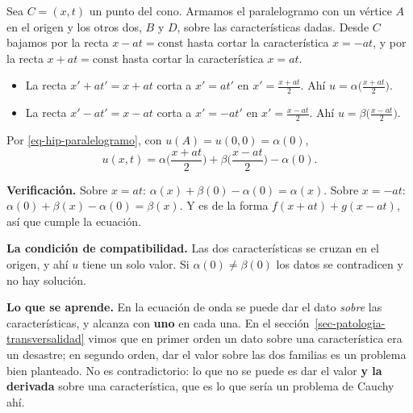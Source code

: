\documentclass[
  spanish,
  a4paper,
]{scrbook}
\providecommand{\tightlist}{%
  \setlength{\itemsep}{0pt}\setlength{\parskip}{0pt}}
\theoremstyle{definition}
\theoremstyle{plain}
\theoremstyle{definition}
\theoremstyle{plain}
\theoremstyle{definition}
\theoremstyle{remark}
\begin{document}
\begin{tcolorbox}[enhanced jigsaw, arc=.35mm, bottomrule=.15mm, bottomtitle=1mm, breakable, colback=white, colbacktitle=quarto-callout-tip-color!10!white, colframe=quarto-callout-tip-color-frame, coltitle=black, left=2mm, leftrule=.75mm, opacityback=0, opacitybacktitle=0.6, rightrule=.15mm, title=\textcolor{quarto-callout-tip-color}{\faLightbulb}\hspace{0.5em}{Solución}, titlerule=0mm, toprule=.15mm, toptitle=1mm]

Sea \(C=(x,t)\) un punto del cono. Armamos el paralelogramo con un
vértice \(A\) en el origen y los otros dos, \(B\) y \(D\), sobre las
características dadas. Desde \(C\) bajamos por la recta
\(x-at=\text{const}\) hasta cortar la característica \(x = -at\), y por
la recta \(x+at = \text{const}\) hasta cortar la característica
\(x=at\).

\begin{itemize}
\tightlist
\item
  La recta \(x' + at' = x + at\) corta a \(x' = at'\) en
  \(x' = \tfrac{x+at}{2}\). Ahí \(u = \alpha\big(\tfrac{x+at}{2}\big)\).
\item
  La recta \(x' - at' = x - at\) corta a \(x' = -at'\) en
  \(x' = \tfrac{x-at}{2}\). Ahí \(u = \beta\big(\tfrac{x-at}{2}\big)\).
\end{itemize}

Por \ref{eq-hip-paralelogramo}, con \(u(A) = u(0,0) = \alpha(0)\), \[
\boxed{\;u(x,t) = \alpha\!\Big(\frac{x+at}{2}\Big) + \beta\!\Big(\frac{x-at}{2}\Big) - \alpha(0).\;}
\]

\textbf{Verificación.} Sobre \(x=at\):
\(\alpha(x) + \beta(0) - \alpha(0) = \alpha(x)\). Sobre \(x=-at\):
\(\alpha(0)+\beta(x)-\alpha(0) = \beta(x)\). Y es de la forma
\(f(x+at)+g(x-at)\), así que cumple la ecuación.

\textbf{La condición de compatibilidad.} Las dos características se
cruzan en el origen, y ahí \(u\) tiene un solo valor. Si
\(\alpha(0)\neq\beta(0)\) los datos se contradicen y no hay solución.

\textbf{Lo que se aprende.} En la ecuación de onda se puede dar el dato
\emph{sobre} las características, y alcanza con \textbf{uno} en cada
una. En el sección~\ref{sec-patologia-transversalidad} vimos que en
primer orden un dato sobre una característica era un desastre; en
segundo orden, dar el valor sobre las dos familias es un problema bien
planteado. No es contradictorio: lo que no se puede es dar el valor
\textbf{y la derivada} sobre una característica, que es lo que sería un
problema de Cauchy ahí.

\end{tcolorbox}
\end{document}
